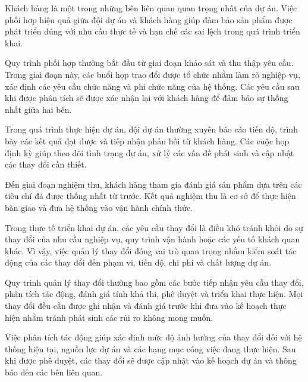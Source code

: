 
\hspace{0.2cm}Khách hàng là một trong những bên liên quan quan trọng nhất của dự án. Việc phối hợp hiệu quả giữa đội dự án và khách hàng giúp đảm bảo sản phẩm được phát triển đúng với nhu cầu thực tế và hạn chế các sai lệch trong quá trình triển khai.

\hspace{0.2cm}Quy trình phối hợp thường bắt đầu từ giai đoạn khảo sát và thu thập yêu cầu. Trong giai đoạn này, các buổi họp trao đổi được tổ chức nhằm làm rõ nghiệp vụ, xác định các yêu cầu chức năng và phi chức năng của hệ thống. Các yêu cầu sau khi được phân tích sẽ được xác nhận lại với khách hàng để đảm bảo sự thống nhất giữa hai bên.

\hspace{0.2cm}Trong quá trình thực hiện dự án, đội dự án thường xuyên báo cáo tiến độ, trình bày các kết quả đạt được và tiếp nhận phản hồi từ khách hàng. Các cuộc họp định kỳ giúp theo dõi tình trạng dự án, xử lý các vấn đề phát sinh và cập nhật các thay đổi cần thiết.

\hspace{0.2cm}Đến giai đoạn nghiệm thu, khách hàng tham gia đánh giá sản phẩm dựa trên các tiêu chí đã được thống nhất từ trước. Kết quả nghiệm thu là cơ sở để thực hiện bàn giao và đưa hệ thống vào vận hành chính thức.


\hspace{0.2cm}Trong thực tế triển khai dự án, các yêu cầu thay đổi là điều khó tránh khỏi do sự thay đổi của nhu cầu nghiệp vụ, quy trình vận hành hoặc các yếu tố khách quan khác. Vì vậy, việc quản lý thay đổi đóng vai trò quan trọng nhằm kiểm soát tác động của các thay đổi đến phạm vi, tiến độ, chi phí và chất lượng dự án.

\hspace{0.2cm}Quy trình quản lý thay đổi thường bao gồm các bước tiếp nhận yêu cầu thay đổi, phân tích tác động, đánh giá tính khả thi, phê duyệt và triển khai thực hiện. Mọi thay đổi đều cần được ghi nhận và đánh giá trước khi đưa vào kế hoạch thực hiện nhằm tránh phát sinh các rủi ro không mong muốn.

\hspace{0.2cm}Việc phân tích tác động giúp xác định mức độ ảnh hưởng của thay đổi đối với hệ thống hiện tại, nguồn lực dự án và các hạng mục công việc đang thực hiện. Sau khi được phê duyệt, các thay đổi sẽ được cập nhật vào kế hoạch dự án và thông báo đến các bên liên quan.

